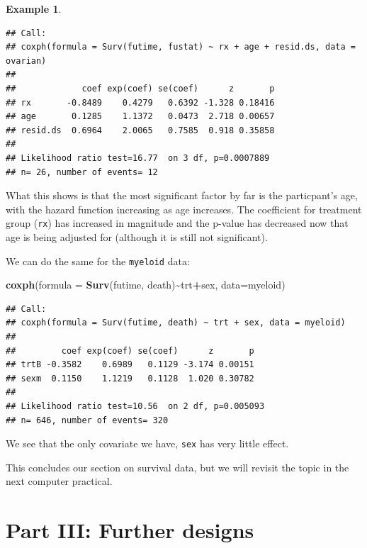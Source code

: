 \documentclass[
  openany]{book}
\newenvironment{Shaded}{\begin{snugshade}}{\end{snugshade}}
\newcommand{\AttributeTok}[1]{\textcolor[rgb]{0.13,0.29,0.53}{#1}}
\newcommand{\FunctionTok}[1]{\textcolor[rgb]{0.13,0.29,0.53}{\textbf{#1}}}
\newcommand{\NormalTok}[1]{#1}
\newcommand{\SpecialCharTok}[1]{\textcolor[rgb]{0.81,0.36,0.00}{\textbf{#1}}}
\theoremstyle{definition}
\theoremstyle{definition}
\newtheorem{example}{Example}[chapter]
\theoremstyle{definition}
\theoremstyle{definition}
\theoremstyle{remark}
\begin{document}
\begin{example}
\begin{verbatim}
## Call:
## coxph(formula = Surv(futime, fustat) ~ rx + age + resid.ds, data = ovarian)
## 
##             coef exp(coef) se(coef)      z       p
## rx       -0.8489    0.4279   0.6392 -1.328 0.18416
## age       0.1285    1.1372   0.0473  2.718 0.00657
## resid.ds  0.6964    2.0065   0.7585  0.918 0.35858
## 
## Likelihood ratio test=16.77  on 3 df, p=0.0007889
## n= 26, number of events= 12
\end{verbatim}

What this shows is that the most significant factor by far is the particpant's age, with the hazard function increasing as age increases. The coefficient for treatment group (\texttt{rx}) has increased in magnitude and the p-value has decreased now that age is being adjusted for (although it is still not significant).

We can do the same for the \texttt{myeloid} data:

\begin{Shaded}
\begin{Highlighting}[]
\FunctionTok{coxph}\NormalTok{(}\AttributeTok{formula =} \FunctionTok{Surv}\NormalTok{(futime, death)}\SpecialCharTok{\textasciitilde{}}\NormalTok{trt}\SpecialCharTok{+}\NormalTok{sex, }\AttributeTok{data=}\NormalTok{myeloid)}
\end{Highlighting}
\end{Shaded}

\begin{verbatim}
## Call:
## coxph(formula = Surv(futime, death) ~ trt + sex, data = myeloid)
## 
##         coef exp(coef) se(coef)      z       p
## trtB -0.3582    0.6989   0.1129 -3.174 0.00151
## sexm  0.1150    1.1219   0.1128  1.020 0.30782
## 
## Likelihood ratio test=10.56  on 2 df, p=0.005093
## n= 646, number of events= 320
\end{verbatim}

We see that the only covariate we have, \texttt{sex} has very little effect.
\end{example}

This concludes our section on survival data, but we will revisit the topic in the next computer practical.

\hypertarget{part-part-iii-further-designs}{%
\part{Part III: Further designs}\label{part-part-iii-further-designs}}
\end{document}
